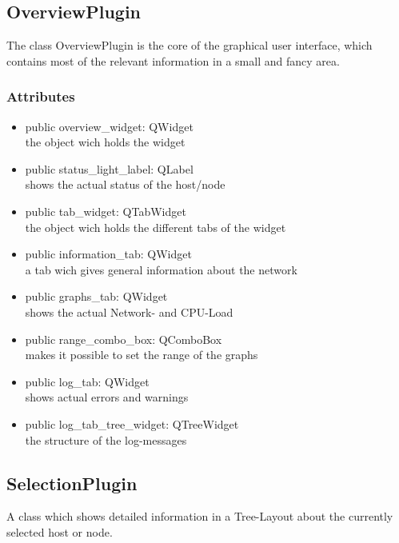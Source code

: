 \subsection{OverviewPlugin}
The class OverviewPlugin is the core of the graphical user interface, which
contains most of the relevant information in a small and fancy area.
\subsubsection{Attributes}
\begin{itemize}
  \item public overview\_widget: QWidget\\
  the object wich holds the widget
  \item public status\_light\_label: QLabel\\
  shows the actual status of the host/node
  \item public tab\_widget: QTabWidget\\
  the object wich holds the different tabs of the widget
  \item public information\_tab: QWidget\\
  a tab wich gives general information about the network 
  \item public graphs\_tab: QWidget\\
  shows the actual Network- and CPU-Load
  \item public range\_combo\_box: QComboBox\\
  makes it possible to set the range of the graphs
  \item public log\_tab: QWidget\\
  shows actual errors and warnings
  \item public log\_tab\_tree\_widget: QTreeWidget\\
  the structure of the log-messages  
\end{itemize}

\subsection{SelectionPlugin}
A class which shows detailed information in a Tree-Layout about the currently
selected host or node.
